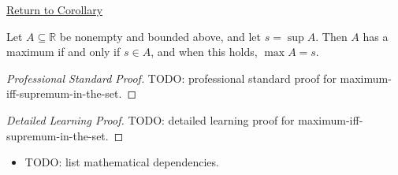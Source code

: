 \newpage
{}
\label{prf:maximum-iff-supremum-in-the-set}

\begin{remark*}[Return]
\hyperref[cor:maximum-iff-supremum-in-the-set]{Return to Corollary}
\end{remark*}

\begin{corollary*}
Let $A\subseteq\mathbb{R}$ be nonempty and bounded above, and let $s=\sup A$.
Then $A$ has a maximum if and only if $s\in A$, and when this holds,
$\max A=s$.
\end{corollary*}

\begin{proof}[Professional Standard Proof]
\LRAProofBodyStart
TODO: professional standard proof for maximum-iff-supremum-in-the-set.
\end{proof}

\begin{proof}[Detailed Learning Proof]
\LRAProofBodyStart
TODO: detailed learning proof for maximum-iff-supremum-in-the-set.
\end{proof}

\begin{remark*}
\end{remark*}

\begin{dependencies}
\begin{itemize}
  \item TODO: list mathematical dependencies.
\end{itemize}
\end{dependencies}

\clearpage
